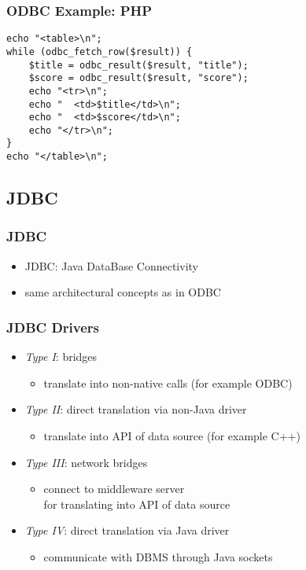 \documentclass[dvipsnames]{beamer}
\theoremstyle{plain}
\begin{document}
\begin{frame}[fragile]
  \frametitle{ODBC Example: PHP}

  \begin{lstlisting}
echo "<table>\n";
while (odbc_fetch_row($result)) {
    $title = odbc_result($result, "title");
    $score = odbc_result($result, "score");
    echo "<tr>\n";
    echo "  <td>$title</td>\n";
    echo "  <td>$score</td>\n";
    echo "</tr>\n";
}
echo "</table>\n";
  \end{lstlisting}
\end{frame}

\subsection{JDBC}

\lstset{language=Java}

\begin{frame}
  \frametitle{JDBC}

  \begin{itemize}
    \item \alert{JDBC}: Java DataBase Connectivity

    \medskip
    \item same architectural concepts as in ODBC
  \end{itemize}
\end{frame}

\begin{frame}
  \frametitle{JDBC Drivers}

  \begin{itemize}
    \item \emph{Type I}: bridges
    \begin{itemize}
      \item translate into non-native calls (for example ODBC)
    \end{itemize}

    \pause
    \medskip
    \item \emph{Type II}: direct translation via non-Java driver
    \begin{itemize}
      \item translate into API of data source (for example C++)
    \end{itemize}

    \pause
    \medskip
    \item \emph{Type III}: network bridges
    \begin{itemize}
      \item connect to middleware server\\
	for translating into API of data source
    \end{itemize}

    \pause
    \medskip
    \item \emph{Type IV}: direct translation via Java driver
    \begin{itemize}
      \item communicate with DBMS through Java sockets
    \end{itemize}
  \end{itemize}
\end{frame}
\end{document}
